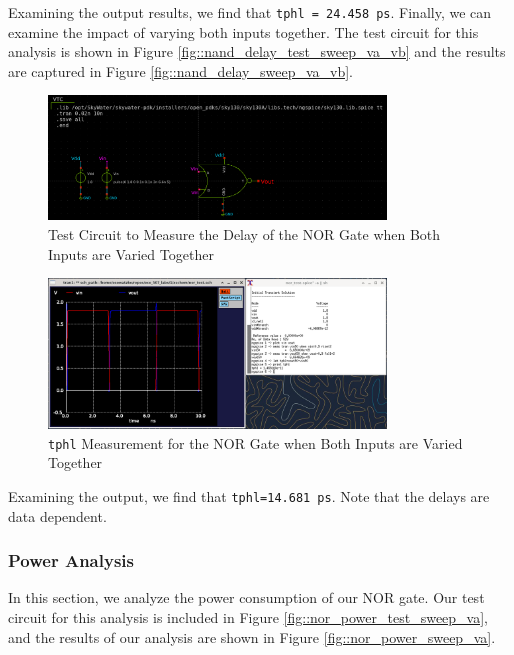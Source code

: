 \documentclass[fleqn]{article}
\begin{document}
	Examining the output results, we find that \texttt{tphl = 24.458 ps}. Finally, we can examine the impact of varying both inputs together. The test circuit for this analysis is shown in Figure  \ref{fig::nand_delay_test_sweep_va_vb} and the results are captured in Figure  \ref{fig::nand_delay_sweep_va_vb}.
	
	\begin{figure}[H]
		\centerline{\includegraphics[width=0.8\textwidth]{nor_delay_test_sweep_va_vb.png}}
		\caption{Test Circuit to Measure the Delay of the NOR Gate when Both Inputs are Varied Together}
		\label{fig::nor_delay_test_sweep_va_vb}
	\end{figure}
	
	\begin{figure}[H]
		\centerline{\includegraphics[width=0.8\textwidth]{nor_delay_sweep_va_vb.png}}
		\caption{\texttt{tphl} Measurement for the NOR Gate when Both Inputs are Varied Together}
		\label{fig::nor_delay_sweep_va_vb}
	\end{figure}
	
	Examining the output, we find that \texttt{tphl=14.681 ps}. Note that the delays are data dependent.
	
	\subsubsection{Power Analysis}
	
	In this section, we analyze the power consumption of our NOR gate. Our test circuit for this analysis is included in Figure \ref{fig::nor_power_test_sweep_va}, and the results of our analysis are shown in Figure \ref{fig::nor_power_sweep_va}.
	
\end{document}
